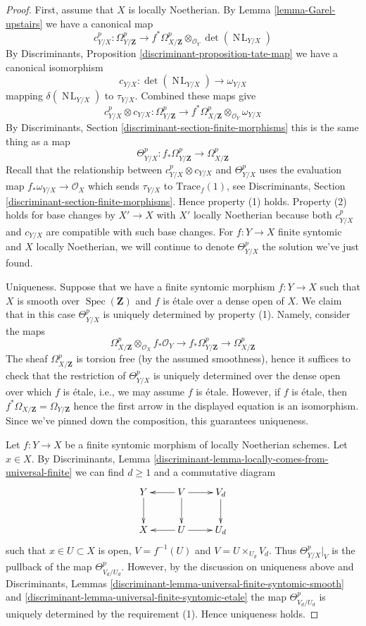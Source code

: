 \documentclass[10pt,a4paper]{amsart}
\theoremstyle{plain}
\theoremstyle{definition}
\theoremstyle{remark}
\numberwithin{equation}{subsection}
\def\Spec{\mathop{\mathrm{Spec}}}
\def\NL{\mathop{N\!L}\nolimits}
\begin{document}
\begin{proof}
First, assume that $X$ is locally Noetherian. By
Lemma \ref{lemma-Garel-upstairs} we have a canonical map
$$
c^p_{Y/X} : \Omega_{Y/\mathbf{Z}}^p
\longrightarrow
f^*\Omega_{X/\mathbf{Z}}^p \otimes_{\mathcal{O}_Y} \det(\NL_{Y/X})
$$
By Discriminants, Proposition \ref{discriminant-proposition-tate-map}
we have a canonical isomorphism
$$
c_{Y/X} : \det(\NL_{Y/X}) \to \omega_{Y/X}
$$
mapping $\delta(\NL_{Y/X})$ to $\tau_{Y/X}$. Combined these maps give
$$
c^p_{Y/X} \otimes c_{Y/X} :
\Omega_{Y/\mathbf{Z}}^p
\longrightarrow
f^*\Omega_{X/\mathbf{Z}}^p \otimes_{\mathcal{O}_Y} \omega_{Y/X}
$$
By Discriminants, Section \ref{discriminant-section-finite-morphisms}
this is the same thing as a map
$$
\Theta_{Y/X}^p :
f_*\Omega_{Y/\mathbf{Z}}^p
\longrightarrow
\Omega_{X/\mathbf{Z}}^p
$$
Recall that the relationship between $c^p_{Y/X} \otimes c_{Y/X}$
and $\Theta_{Y/X}^p$ uses the evaluation map
$f_*\omega_{Y/X} \to \mathcal{O}_X$
which sends $\tau_{Y/X}$ to $\text{Trace}_f(1)$, see
Discriminants, Section \ref{discriminant-section-finite-morphisms}.
Hence property (1) holds. Property (2) holds for base changes by
$X' \to X$ with $X'$ locally Noetherian because both $c^p_{Y/X}$ and
$c_{Y/X}$ are compatible with such base changes. For $f : Y \to X$
finite syntomic and $X$ locally Noetherian,
we will continue to denote $\Theta^p_{Y/X}$ the solution we've just found.

\medskip\noindent
Uniqueness. Suppose that we have a finite syntomic morphism
$f: Y \to X$ such that $X$ is smooth over $\Spec(\mathbf{Z})$
and $f$ is \'etale over a dense open of $X$. We claim that
in this case $\Theta^p_{Y/X}$ is uniquely determined by property (1).
Namely, consider the maps
$$
\Omega^p_{X/\mathbf{Z}} \otimes_{\mathcal{O}_X} f_*\mathcal{O}_Y \to
f_*\Omega^p_{Y/\mathbf{Z}} \to
\Omega^p_{X/\mathbf{Z}}
$$
The sheaf $\Omega^p_{X/\mathbf{Z}}$ is torsion free (by the assumed
smoothness), hence it suffices to check that the restriction of
$\Theta^p_{Y/X}$ is uniquely determined over the dense open over
which $f$ is \'etale, i.e., we may assume $f$ is \'etale.
However, if $f$ is \'etale, then
$f^*\Omega_{X/\mathbf{Z}} = \Omega_{Y/\mathbf{Z}}$
hence the first arrow in the displayed equation is an isomorphism.
Since we've pinned down the composition, this guarantees uniqueness.

\medskip\noindent
Let $f : Y \to X$ be a finite syntomic morphism of locally Noetherian schemes.
Let $x \in X$. By Discriminants, Lemma
\ref{discriminant-lemma-locally-comes-from-universal-finite}
we can find $d \geq 1$ and a commutative diagram
$$
\xymatrix{
Y \ar[d] &
V \ar[d] \ar[l] \ar[r] &
V_d \ar[d] \\
X &
U \ar[l] \ar[r] &
U_d
}
$$
such that $x \in U \subset X$ is open, $V = f^{-1}(U)$
and $V = U \times_{U_d} V_d$. Thus $\Theta^p_{Y/X}|_V$
is the pullback of the map $\Theta^p_{V_d/U_d}$.
However, by the discussion on uniqueness above and
Discriminants, Lemmas
\ref{discriminant-lemma-universal-finite-syntomic-smooth} and
\ref{discriminant-lemma-universal-finite-syntomic-etale}
the map $\Theta^p_{V_d/U_d}$ is uniquely determined
by the requirement (1). Hence uniqueness holds.


\end{proof}
\end{document}
